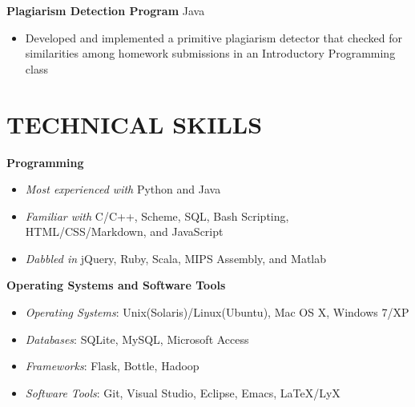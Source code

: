 \documentclass[margin]{res}
\begin{document}
\begin{resume}
\textbf{Plagiarism Detection Program} \hfill Java
\begin{itemize}[leftmargin=10pt]
\itemsep -2pt %
\item Developed and implemented a primitive plagiarism detector that checked for similarities among homework submissions in an Introductory Programming class
\end{itemize}

\section{TECHNICAL SKILLS}
\textbf{Programming}
\begin{itemize}[leftmargin=10pt]
\item \textit{Most experienced with} Python and Java
\item \textit{Familiar with} C/C++, Scheme, SQL, Bash Scripting, HTML/CSS/Markdown, and JavaScript
\item \textit{Dabbled in} jQuery, Ruby, Scala, MIPS Assembly, and Matlab
\end{itemize}

\textbf{Operating Systems and Software Tools}
\begin{itemize}[leftmargin=10pt]
\item \textit{Operating Systems}: Unix(Solaris)/Linux(Ubuntu), Mac OS X, Windows 7/XP
\item \textit{Databases}: SQLite, MySQL, Microsoft Access
\item \textit{Frameworks}: Flask, Bottle, Hadoop
\item \textit{Software Tools}: Git, Visual Studio, Eclipse, Emacs, \LaTeX{}/LyX
\end{itemize}

\end{resume}
\end{document}
